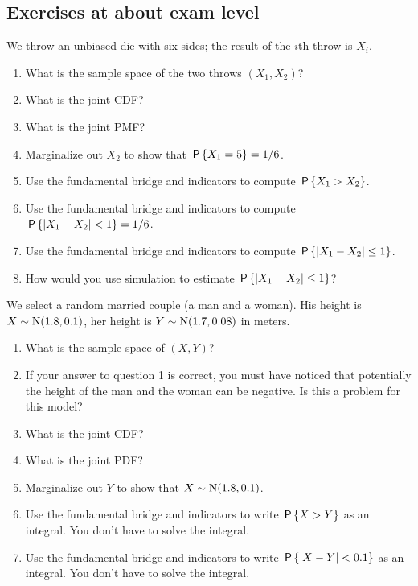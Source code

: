 \documentclass[assignments]{subfiles}
\begin{document}
\subsection{Exercises at about exam level}
\label{sec:below-exam-level}



\begin{exercise}\label{ex:1}
We throw an unbiased die with six sides; the result of the $i$th throw is $X_i$. 
\begin{enumerate}
\item What is the sample space of the two throws $(X_{1}, X_2)$?
\item What is the joint CDF?
\item What is the joint PMF?
\item  Marginalize out $X_2$ to show that $\P{X_1=5} = 1/6$.
\item Use the fundamental bridge and indicators to compute $\P{X_1>X_2}$.
\item Use the fundamental bridge and indicators to compute $\P{|X_1-X_2| < 1 } = 1/6$.
\item Use the fundamental bridge and indicators to compute $\P{|X_1-X_2|\leq 1 }$.
\item How would you use simulation to estimate  $\P{|X_1-X_2|\leq 1 }$?
\end{enumerate}
\end{exercise}

\begin{exercise}
We select a random married couple (a man and a woman). His height is $X\sim \Norm{1.8, 0.1}$, her height is $Y\sim \Norm{1.7, 0.08}$ in meters. 
\begin{enumerate}
\item What is the sample space of $(X, Y)$?
\item If your answer to question 1 is correct, you must have noticed that potentially the height of the man and the woman can be negative. Is this a problem for this model? 
\item What is the joint CDF?
\item What is the joint PDF?
\item  Marginalize out $Y$ to show that $X\sim \Norm{1.8, 0.1}$.
\item Use the fundamental bridge and indicators to write  $\P{X>Y}$ as an integral. You don't have to solve the integral.
\item Use the fundamental bridge and indicators to write  $\P{|X-Y| < 0.1 }$ as an integral. You don't have to solve the integral.
\end{enumerate}
\end{exercise}
\end{document}
